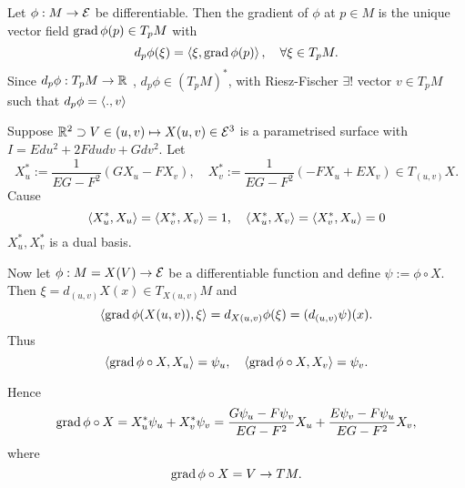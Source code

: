 \begin{definition}
	Let $\phi: M \to \mathcal E$ be differentiable. Then the gradient of $\phi$ at $p \in M$ is the unique vector field $\operatorname{grad} \phi(p) \in T_pM$ with
		\[ d_p\phi(\xi) = \left \langle \xi, \operatorname{grad} \phi(p) \right\rangle, \quad \forall \xi \in T_pM. \]
	Since  $d_p\phi : T_pM \to \mathbb R $ , $d_p \phi \in (T_pM)^*$, with Riesz-Fischer $\exists!$ vector $v \in T_pM$ such that $d_p\phi= \left \langle .,v \right\rangle$
\end{definition}

\begin{example}
	Suppose $\mathbb R^2 \supset V \in (u,v) \mapsto X(u,v) \in \mathcal E^3$ is a parametrised surface with $I= Edu^2 + 2Fdudv + Gdv^2$. Let
		\[ X_u^*:= \frac 1{EG-F^2}(GX_u-FX_v), \quad
			X_v^*:= \frac 1{EG-F^2} (-FX_u +EX_v) \in T_{(u,v)}X. \]
	Cause
		\[ \left \langle X_u^*,X_u \right\rangle = \left \langle X_v^*,X_v \right\rangle=1, \quad
			\left \langle X_u^*,X_v \right\rangle = \left \langle X_v^*,X_u \right\rangle =0 \]
	$X_u^*,X_v^*$ is a dual basis. 
	
	Now let $\phi : M= X(V) \to \mathcal E$ be a differentiable function and define $\psi := \phi \circ X$. Then $\xi = d_{(u,v)} X(x)  \in T_{X(u,v)}M$ and
		\[ \left \langle \operatorname{grad} \phi(X(u,v)), \xi \right\rangle = d_{X(u,v)}\phi(\xi) = (d_{(u,v)}\psi)(x). \]
	Thus 
		\[\left \langle  \operatorname{grad} \phi \circ X, X_u \right\rangle = \psi_u, \quad \left \langle  \operatorname{grad} \phi \circ X, X_v \right\rangle = \psi_v.\]
		
	Hence 
		\[ \operatorname{grad} \phi \circ X = X_u^*\psi_u + X_v^*\psi_v
			= \frac {G\psi_u - F\psi_v}{EG-F^2}X_u + \frac {E\psi_v - F\psi_u}{EG-F^2}X_v, \]
	where
		\[ \operatorname{grad} \phi \circ X = V \to TM. \]
\end{example}
	

